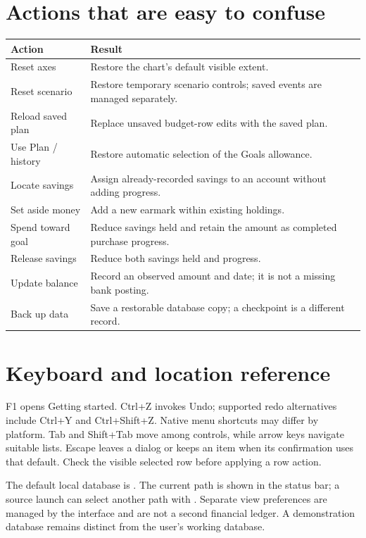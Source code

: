 \section{Actions that are easy to confuse}
\begin{tabularx}{\textwidth}{@{}p{}Y@{}}
\toprule Action & Result\\\midrule
Reset axes & Restore the chart's default visible extent.\\
Reset scenario & Restore temporary scenario controls; saved events are managed separately.\\
Reload saved plan & Replace unsaved budget-row edits with the saved plan.\\
Use Plan / history & Restore automatic selection of the Goals allowance.\\
Locate savings & Assign already-recorded savings to an account without adding progress.\\
Set aside money & Add a new earmark within existing holdings.\\
Spend toward goal & Reduce savings held and retain the amount as completed purchase progress.\\
Release savings & Reduce both savings held and progress.\\
Update balance & Record an observed amount and date; it is not a missing bank posting.\\
Back up data & Save a restorable database copy; a checkpoint is a different record.\\
\bottomrule
\end{tabularx}

\section{Keyboard and location reference}
F1 opens Getting started. Ctrl+Z invokes Undo; supported redo alternatives include Ctrl+Y and Ctrl+Shift+Z. Native menu shortcuts may differ by platform. Tab and Shift+Tab move among controls, while arrow keys navigate suitable lists. Escape leaves a dialog or keeps an item when its confirmation uses that default. Check the visible selected row before applying a row action.

The default local database is . The current path is shown in the status bar; a source launch can select another path with . Separate view preferences are managed by the interface and are not a second financial ledger. A demonstration database remains distinct from the user's working database.

